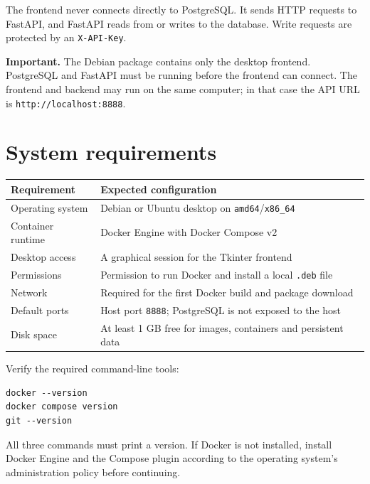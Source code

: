 \documentclass[11pt,a4paper]{article}
\begin{document}
The frontend never connects directly to PostgreSQL. It sends HTTP requests to
FastAPI, and FastAPI reads from or writes to the database. Write requests are
protected by an \texttt{X-API-Key}.

\begin{warnbox}
\textbf{Important.} The Debian package contains only the desktop frontend.
PostgreSQL and FastAPI must be running before the frontend can connect. The
frontend and backend may run on the same computer; in that case the API URL is
\texttt{http://localhost:8888}.
\end{warnbox}

\section{System requirements}

\begin{tabularx}{\linewidth}{@{}p{4.1cm}X@{}}
\toprule
\textbf{Requirement} & \textbf{Expected configuration} \\
\midrule
Operating system & Debian or Ubuntu desktop on \texttt{amd64}/\texttt{x86\_64} \\
Container runtime & Docker Engine with Docker Compose v2 \\
Desktop access & A graphical session for the Tkinter frontend \\
Permissions & Permission to run Docker and install a local \texttt{.deb} file \\
Network & Required for the first Docker build and package download \\
Default ports & Host port \texttt{8888}; PostgreSQL is not exposed to the host \\
Disk space & At least 1 GB free for images, containers and persistent data \\
\bottomrule
\end{tabularx}

Verify the required command-line tools:

\begin{lstlisting}[caption={Checking Docker, Compose and Git}]
docker --version
docker compose version
git --version
\end{lstlisting}

All three commands must print a version. If Docker is not installed, install
Docker Engine and the Compose plugin according to the operating system's
administration policy before continuing.
\end{document}
